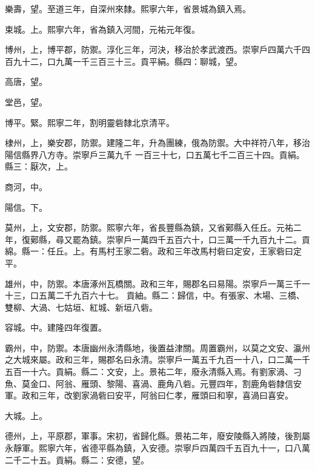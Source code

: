 \begin{pinyinscope}
 樂壽，望。至道三年，自深州來隸。熙寧六年，省景城為鎮入焉。



 束城。上。熙寧六年，省為鎮入河間，元祐元年復。



 博州，上，博平郡，防禦。淳化三年，河決，移治於孝武渡西。崇寧戶四萬六千四百九十二，口九萬一千三百三十三。貢平絹。縣四：聊城，望。



 高唐，望。



 堂邑，望。



 博平。緊。熙寧二年，割明靈砦隸北京清平。



 棣州，上，樂安郡，防禦。建隆二年，升為團練，俄為防禦。大中祥符八年，移治陽信縣界八方寺。崇寧戶三萬九千
 一百三十七，口五萬七千二百三十四。貢絹。縣三：厭次，上。



 商河，中。



 陽信。下。



 莫州，上，文安郡，防禦。熙寧六年，省長豐縣為鎮，又省鄚縣入任丘。元祐二年，復鄚縣，尋又罷為鎮。崇寧戶一萬四千五百六十，口三萬一千九百九十二。貢綿。縣一：任丘。上。有馬村王家二砦。政和三年改馬村砦曰定安，王家砦曰定平。



 雄州，中，防禦。本唐涿州瓦橋關。政和三年，賜郡名曰易陽。崇寧戶一萬三千一十三，口五萬二千九百六十七。
 貢紬。縣二：歸信，中。有張家、木場、三橋、雙柳、大渦、七姑垣、紅城、新垣八砦。



 容城。中。建隆四年復置。



 霸州，中，防禦。本唐幽州永清縣地，後置益津關。周置霸州，以莫之文安、瀛州之大城來屬。政和三年，賜郡名曰永清。崇寧戶一萬五千九百一十八，口二萬一千五百一十六。貢絹。縣二：文安，上。景祐二年，廢永清縣入焉。有劉家渦、刁魚、莫金口、阿翁、雁頭、黎陽、喜渦、鹿角八砦。元豐四年，割鹿角砦隸信安軍。政和三年，改劉家渦砦曰安平，阿翁曰仁孝，雁頭曰和寧，喜渦曰喜安。



 大城。上。



 德州，上，平原郡，軍事。宋初，省歸化縣。景祐二年，廢安陵縣入將陵，後割屬永靜軍。熙寧六年，省德平縣為鎮，入安德。崇寧戶四萬四千五百九十一，口八萬二千二十五。貢絹。縣二：安德，望。




\end{pinyinscope}

